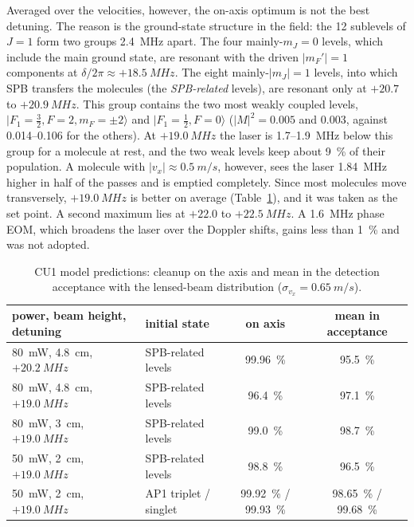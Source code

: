 \documentclass[11pt,a4paper,oneside]{report}
\begin{document}
Averaged over the velocities, however, the on-axis optimum is not the best detuning. The reason is
the ground-state structure in the field: the 12 sublevels of $J=1$ form two groups \SI{2.4}{MHz}
apart. The four mainly-$m_J=0$ levels, which include the main ground state, are resonant with the
driven $|m_F'|=1$ components at $\delta/2\pi\approx+\SI{18.5}{MHz}$. The eight mainly-$|m_J|=1$
levels, into which SPB transfers the molecules (the \emph{SPB-related} levels), are resonant only at
$+20.7$ to $+\SI{20.9}{MHz}$. This group contains the two most weakly coupled levels,
$|F_1=\tfrac32,F=2,m_F=\pm2\rangle$ and $|F_1=\tfrac12,F=0\rangle$ ($|M|^2=0.005$ and 0.003,
against 0.014--0.106 for the others). At $+\SI{19.0}{MHz}$ the laser is 1.7--\SI{1.9}{MHz} below
this group for a molecule at rest, and the two weak levels keep about \SI{9}{\percent} of their
population. A molecule with $|v_x|\approx\SI{0.5}{m/s}$, however, sees the laser \SI{1.84}{MHz}
higher in half of the passes and is emptied completely. Since most molecules move transversely,
$+\SI{19.0}{MHz}$ is better on average (Table~\ref{tab:cu1_pred}), and it was taken as the set
point. A second maximum lies at $+22.0$ to $+\SI{22.5}{MHz}$. A \SI{1.6}{MHz} phase EOM, which
broadens the laser over the Doppler shifts, gains less than \SI{1}{\percent} and was not adopted.

\begin{table}[htbp]
  \centering
  \caption[CU1 predictions]{CU1 model predictions: cleanup on the axis and mean in the detection
  acceptance with the lensed-beam distribution ($\sigma_{v_x}=\SI{0.65}{m/s}$).}
  \label{tab:cu1_pred}
  \small
  \begin{tabular}{llcc}
    \toprule
    power, beam height, detuning & initial state & on axis & mean in acceptance \\
    \midrule
    \SI{80}{mW}, \SI{4.8}{cm}, $+\SI{20.2}{MHz}$ & SPB-related levels & \SI{99.96}{\percent} & \SI{95.5}{\percent} \\
    \SI{80}{mW}, \SI{4.8}{cm}, $+\SI{19.0}{MHz}$ & SPB-related levels & \SI{96.4}{\percent} & \SI{97.1}{\percent} \\
    \SI{80}{mW}, \SI{3}{cm}, $+\SI{19.0}{MHz}$ & SPB-related levels & \SI{99.0}{\percent} & \SI{98.7}{\percent} \\
    \SI{50}{mW}, \SI{2}{cm}, $+\SI{19.0}{MHz}$ & SPB-related levels & \SI{98.8}{\percent} & \SI{96.5}{\percent} \\
    \SI{50}{mW}, \SI{2}{cm}, $+\SI{19.0}{MHz}$ & AP1 triplet / singlet & \SI{99.92}{\percent} / \SI{99.93}{\percent} & \SI{98.65}{\percent} / \SI{99.68}{\percent} \\
    \bottomrule
  \end{tabular}
\end{table}
\end{document}
